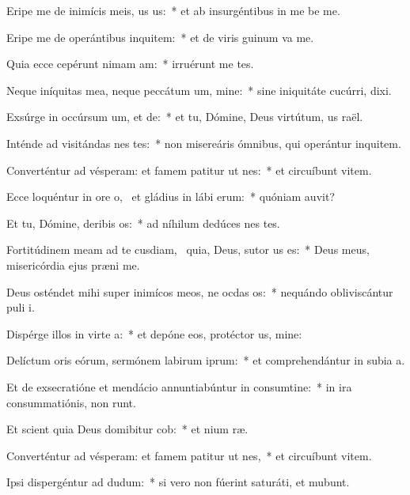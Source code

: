\item Eripe me de inimícis meis, us us:~* et ab insurgéntibus in me be me.
\item Eripe me de operántibus inquitem:~* et de viris guinum va me.
\item Quia ecce cepérunt nimam am:~* irruérunt  me tes.
\item Neque iníquitas mea, neque peccátum um, mine:~* sine iniquitáte cucúrri,  dixi.
\item Exsúrge in occúrsum um, et de:~* et tu, Dómine, Deus virtútum, us raël.
\item Inténde ad visitándas nes tes:~* non misereáris ómnibus, qui operántur inquitem.
\item Converténtur ad vésperam: et famem patitur ut nes:~* et circuíbunt vitem.
\item Ecce loquéntur in ore o,~\pscross{} et gládius in lábi erum:~* quóniam  auvit?
\item Et tu, Dómine, deribis os:~* ad níhilum dedúces nes tes.
\item Fortitúdinem meam ad te cusdiam,~\pscross{} quia, Deus, sutor us es:~* Deus meus, misericórdia ejus præni me.
\item Deus osténdet mihi super inimícos meos, ne ocdas os:~* nequándo obliviscántur puli i.
\item Dispérge illos in virte a:~* et depóne eos, protéctor us, mine:
\item Delíctum oris eórum, sermónem labirum iprum:~* et comprehendántur in subia a.
\item Et de exsecratióne et mendácio annuntiabúntur in consumtine:~* in ira consummatiónis,  non runt.
\item Et scient quia Deus domibitur cob:~* et nium ræ.
\item Converténtur ad vésperam: et famem patitur ut nes,~* et circuíbunt vitem.
\item Ipsi dispergéntur ad dudum:~* si vero non fúerint saturáti, et mubunt.
